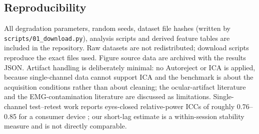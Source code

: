 \subsection*{Reproducibility}
All degradation parameters, random seeds, dataset file hashes (written by
\texttt{scripts/01\_download.py}), analysis scripts and derived feature tables are
included in the repository. Raw datasets are not redistributed; download scripts
reproduce the exact files used. Figure source data are archived with the results JSON.
Artifact handling is deliberately minimal: no Autoreject or ICA is applied, because
single-channel data cannot support ICA and the benchmark is about the acquisition
conditions rather than about cleaning; the ocular-artifact literature
\citep{gratton1983ocular,croft2000ocular} and the EMG-contamination literature
\citep{whitham2007emg,goncharova2003emg,muthukumaraswamy2013highfreq} are discussed as
limitations. Single-channel test--retest work reports eyes-closed relative-power ICCs of
roughly 0.76--0.85 for a consumer device \citep{rogers2016reliability}; our short-lag
estimate is a within-session stability measure and is not directly comparable.
